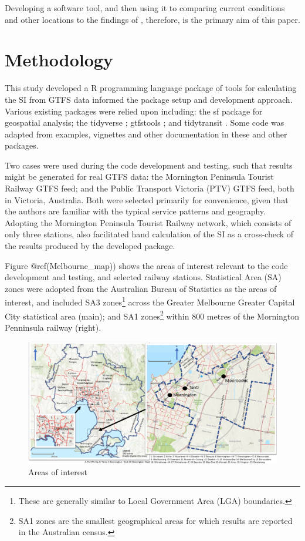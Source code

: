 \documentclass[preprint, 3p,
authoryear]{elsarticle} %
\begin{document}
Developing a software tool, and then using it to comparing current
conditions and other locations to the findings of
\citet{currie2010identifying}, therefore, is the primary aim of this
paper.

\hypertarget{methodology}{%
\section{Methodology}\label{methodology}}

This study developed a R programming language \citep{R-base} package of
tools for calculating the SI from GTFS data \citet{wickham2023r}
informed the package setup and development approach. Various existing
packages were relied upon including: the sf package \citep{R-sf} for
geospatial analysis; the tidyverse \citep{tidyverse2019}; gtfstools
\citep{R-gtfstools}; and tidytransit \citep{R-tidytransit}. Some code
was adapted from examples, vignettes and other documentation in these
and other packages.

Two cases were used during the code development and testing, such that
results might be generated for real GTFS data: the Mornington Peninsula
Tourist Railway GTFS feed; and the Public Transport Victoria (PTV) GTFS
feed, both in Victoria, Australia. Both were selected primarily for
convenience, given that the authors are familiar with the typical
service patterns and geography. Adopting the Mornington Peninsula
Tourist Railway network, which consists of only three stations, also
facilitated hand calculation of the SI as a cross-check of the results
produced by the developed package.

Figure @ref(Melbourne\_map)) shows the areas of interest relevant to the
code development and testing, and selected railway stations. Statistical
Area (SA) zones were adopted from the Australian Bureau of Statistics
\citep{ABSmaps} as the areas of interest, and included SA3
zones\footnote{These are generally similar to Local Government Area
  (LGA) boundaries.} across the Greater Melbourne Greater Capital City
statistical area (main); and SA1 zones\footnote{SA1 zones are the
  smallest geographical areas for which results are reported in the
  Australian census.} within 800 metres of the Mornington Penninsula
railway (right).

\begin{figure}
\includegraphics[width=1\linewidth]{graphics/all_maps} \caption{Areas of interest}\label{fig:Melbourne_map}
\end{figure}
\end{document}
